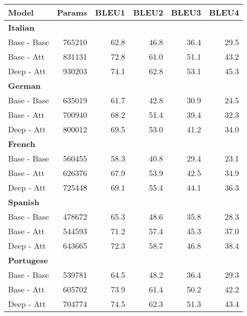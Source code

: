 \begin{tabular}{lrrrrr}
\hline
 \textbf{Model} & \textbf{Params} &  \textbf{BLEU1} &  \textbf{BLEU2} &  \textbf{BLEU3} &  \textbf{BLEU4} \\
\hline
{\textbf{Italian}} &         &        &        &        &        \\ 
           Base - Base &  765210 &   62.8 &   46.8 &   36.4 &   29.5 \\
      Base - Att &  831131 &   72.8 &   61.0 &   51.1 &   43.2 \\
 Deep - Att &  930203 &   74.1 &   62.8 &   53.1 &   45.3 \\
\hline
{\textbf{German}} &         &        &        &        &        \\ 
           Base - Base &  635019 &   61.7 &   42.8 &   30.9 &   24.5 \\
      Base - Att &  700940 &   68.2 &   51.4 &   39.4 &   32.3 \\
 Deep - Att &  800012 &   69.5 &   53.0 &   41.2 &   34.0 \\
\hline
{\textbf{French}} &         &        &        &        &        \\ 
           Base - Base &  560455 &   58.3 &   40.8 &   29.4 &   23.1 \\
      Base - Att &  626376 &   67.9 &   53.9 &   42.5 &   34.9 \\
 Deep - Att &  725448 &   69.1 &   55.4 &   44.1 &   36.3 \\
\hline
{\textbf{Spanish}}&         &        &        &        &        \\ 
           Base - Base &  478672 &   65.3 &   48.6 &   35.8 &   28.3 \\
      Base - Att &  544593 &   71.2 &   57.4 &   45.3 &   37.0 \\
 Deep - Att &  643665 &   72.3 &   58.7 &   46.8 &   38.4 \\
\hline
{\textbf{Portugese}}&         &        &        &        &        \\ 
           Base - Base &  539781 &   64.5 &   48.2 &   36.4 &   29.3 \\
      Base - Att &  605702 &   73.9 &   61.4 &   50.2 &   42.2 \\
 Deep - Att &  704774 &   74.5 &   62.3 &   51.3 &   43.4 \\
\hline
\end{tabular}
